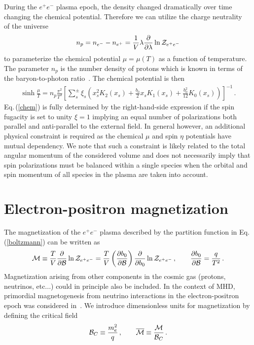 \documentclass[a4paper]{article}
\newcommand{\req}[1]{Eq.\,(\ref{#1})}
\begin{document}
During the $e^{+}e^{-}$ plasma epoch, the density changed dramatically over time changing the chemical potential. Therefore we can utilize the charge neutrality~\cite{rafelski2023short,letessier2002hadrons} of the universe
\begin{align}
    \label{chargeneutrality}
    n_{p}=n_{e^{-}}-n_{e^{+}}=\frac{1}{V}\lambda\frac{\partial}{\partial\lambda}\ln{\cal Z}_{e^{+}e^{-}}
\end{align}
to parameterize the chemical potential $\mu=\mu(T)$ as a function of temperature. The parameter $n_{p}$ is the number density of protons which is known in terms of the baryon-to-photon ratio~\cite{workman2022pdg}. The chemical potential is then
\begin{align}
    \label{chem}
    \sinh{\frac{\mu}{T}}=n_{p}\frac{\pi^{2}}{T^{3}}\left[\sum_{s}^{\pm}\xi_{s}\left(x_{s}^{2}K_{2}(x_{s})+\frac{b_{0}}{2}x_{s}K_{1}(x_{s})+\frac{b_{0}^{2}}{12}K_{0}(x_{s})\right)\right]^{-1}\,.
\end{align}
\req{chem} is fully determined by the right-hand-side expression if the spin fugacity is set to unity $\xi=1$ implying an equal number of polarizations both parallel and anti-parallel to the external field. In general however, an additional physical constraint is required as the chemical $\mu$ and spin $\eta$ potentials have mutual dependency. We note that such a constraint is likely related to the total angular momentum of the considered volume and does not necessarily imply that spin polarizations must be balanced within a single species when the orbital and spin momentum of all species in the plasma are taken into account.

\section{Electron-positron magnetization}
\label{sec:magnetization}
\noindent The magnetization of the $e^{+}e^{-}$ plasma described by the partition function in \req{boltzmann} can be written as
\begin{align}
    \label{defmagetization}
    {\cal M}\equiv\frac{T}{V}\frac{\partial}{\partial{\cal B}}\ln{{\cal Z}_{e^{+}e^{-}}} = \frac{T}{V}\left(\frac{\partial b_{0}}{\partial{\cal B}}\right)\frac{\partial}{\partial b_{0}}\ln{{\cal Z}_{e^{+}e^{-}}}\,,\qquad\frac{\partial b_{0}}{\partial{\cal B}}=\frac{q}{T^{2}}\,.
\end{align}
Magnetization arising from other components in the cosmic gas (protons, neutrinos, etc...) could in principle also be included. In the context of MHD, primordial magnetogenesis from neutrino interactions in the electron-positron epoch was considered in~\cite{perrone2021neutrinoelectron}. We introduce dimensionless units for magnetization by defining the critical field
\begin{align}
    {\cal B}_{C}\equiv\frac{m_{e}^{2}}{q}\,,\qquad{\overline{\cal M}}\equiv\frac{\cal M}{{\cal B}_{C}}\,.
\end{align}
\end{document}
